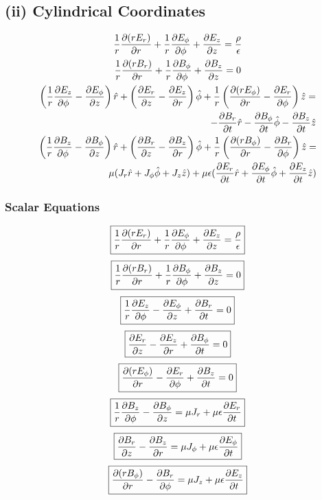 \documentclass[11pt, a4paper]{article}
\begin{document}
\subsection*{(ii) Cylindrical Coordinates}
\begin{gather}
    \frac{1}{r}\pdv{(rE_r)}{r}+\frac{1}{r}\pdv{E_\phi}{\phi}+\pdv{E_{z} }{z} = \frac{\rho}{\epsilon }\\
    \frac{1}{r}\pdv{(rB_r)}{r}+\frac{1}{r}\pdv{B_\phi}{\phi}+\pdv{B_z}{z} = 0\\
    \begin{split}
    \left(\frac{1}{r}\pdv{E_z}{\phi}-\pdv{E_\phi}{z} \right)\hat{r} + \left(\pdv{E_r}{z}-\pdv{E_z}{r} \right)\hat{\phi} +\frac{1}{r}\left(\pdv{(rE_\phi)}{r}-\pdv{E_r}{\phi}\right)\hat{z} =\\ -\pdv{B_r}{t}\hat{r} -\pdv{B_\phi}{t}\hat{\phi} -\pdv{B_z}{t}\hat{z} 
    \end{split}\\
    \begin{split}
        \left(\frac{1}{r}\pdv{B_z}{\phi}-\pdv{B_\phi}{z} \right)\hat{r} + \left(\pdv{B_r}{z}-\pdv{B_z}{r} \right)\hat{\phi} +\frac{1}{r}\left(\pdv{(rB_\phi)}{r}-\pdv{B_r}{\phi}\right)\hat{z} = \\ \mu (J_{r} \hat{r} + J_\phi \hat{\phi} +J_z \hat{z} )+ \mu \epsilon (\pdv{E_{r} }{t}\hat{r} +\pdv{E_{\phi} }{t}\hat{\phi} +\pdv{E_{z} }{t}\hat{z})
    \end{split}
\end{gather}
\subsubsection*{Scalar Equations}
\begin{equation}
\boxed{\frac{1}{r}\pdv{(rE_r)}{r}+\frac{1}{r}\pdv{E_\phi}{\phi}+\pdv{E_{z} }{z} = \frac{\rho}{\epsilon }}
\end{equation}
\begin{equation}
\boxed{\frac{1}{r}\pdv{(rB_r)}{r}+\frac{1}{r}\pdv{B_\phi}{\phi}+\pdv{B_z}{z} = 0}
\end{equation}
\begin{equation}
\boxed{\frac{1}{r}\pdv{E_z}{\phi}-\pdv{E_\phi}{z}+\pdv{B_r}{t} =0}
\end{equation}
\begin{equation}
\boxed{ \pdv{E_r}{z}-\pdv{E_z}{r}+\pdv{B_\phi}{t}=0 }
\end{equation}
\begin{equation}
\boxed{\pdv{(rE_\phi)}{r}-\pdv{E_r}{\phi}+\pdv{B_z}{t}=0}
\end{equation}
\begin{equation}
\boxed{\frac{1}{r}\pdv{B_z}{\phi}-\pdv{B_\phi}{z}=\mu J_r + \mu \epsilon \pdv{E_r}{t}}
\end{equation}
\begin{equation}
\boxed{\pdv{B_r}{z}-\pdv{B_z}{r}=\mu J_\phi + \mu \epsilon \pdv{E_\phi}{t}}
\end{equation}
\begin{equation}
\boxed{\pdv{(rB_\phi)}{r}-\pdv{B_r}{\phi}=\mu J_z + \mu \epsilon \pdv{E_z}{t}}
\end{equation}
\end{document}
